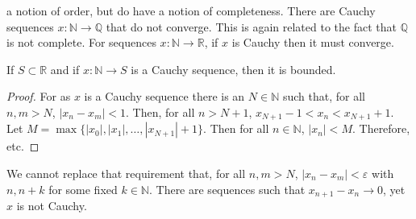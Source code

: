 \documentclass[crop=false,class=book,oneside]{standalone}
\begin{document}
            a notion of order, but do have a notion
            of completeness. There are Cauchy sequences
            $x:\mathbb{N}\rightarrow\mathbb{Q}$ that do
            not converge. This is again related to the fact
            that $\mathbb{Q}$ is not complete. For sequences
            $x:\mathbb{N}\rightarrow\mathbb{R}$,
            if $x$ is Cauchy then it must converge.
            \begin{theorem}
                If $S\subset\mathbb{R}$ and if
                $x:\mathbb{N}\rightarrow{S}$
                is a Cauchy sequence, then it is bounded.
            \end{theorem}
            \begin{proof}
                For as $x$ is a Cauchy sequence there is an
                $N\in\mathbb{N}$ such that, for all $n,m>N$,
                $|x_{n}-x_{m}|<1$. Then, for all $n>N+1$,
                $x_{N+1}-1<x_{n}<x_{N+1}+1$. Let
                $M=\max\{|x_{0}|,|x_{1}|,\hdots,|x_{N+1}|+1\}$.
                Then for all $n\in\mathbb{N}$,
                $|x_{n}|<M$. Therefore, etc.
            \end{proof}
            We cannot replace that requirement that,
            for all $n,m>N$, $|x_{n}-x_{m}|<\varepsilon$
            with $n,n+k$ for some fixed $k\in\mathbb{N}$.
            There are sequences such that
            $x_{n+1}-x_{n}\rightarrow{0}$,
            yet $x$ is not Cauchy.
\end{document}
